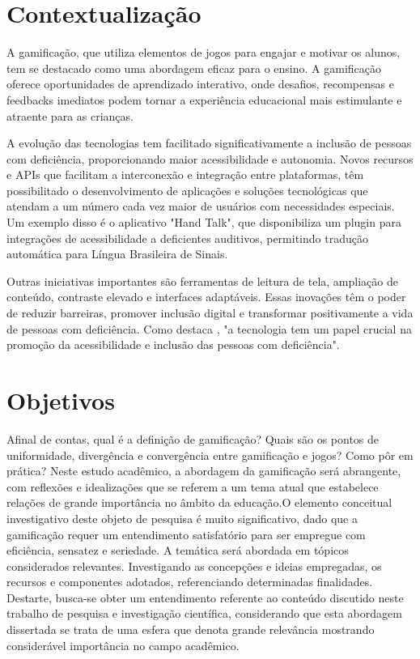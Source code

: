 \section{Contextualização}

A gamificação, que utiliza elementos de jogos para engajar e motivar os alunos, tem se destacado como uma abordagem eficaz para o ensino. A gamificação oferece oportunidades de aprendizado interativo, onde desafios, recompensas e feedbacks imediatos podem tornar a experiência educacional mais estimulante e atraente para as crianças.

A evolução das tecnologias tem facilitado significativamente a inclusão de pessoas com deficiência, proporcionando maior acessibilidade e autonomia. Novos recursos e APIs que facilitam a interconexão e integração entre plataformas, têm possibilitado o desenvolvimento de aplicações e soluções tecnológicas que atendam a um número cada vez maior de usuários com necessidades especiais. Um exemplo disso é o aplicativo "Hand Talk", que disponibiliza um plugin para integrações de acessibilidade a deficientes auditivos, permitindo tradução automática para Língua Brasileira de Sinais.

Outras iniciativas importantes são ferramentas de leitura de tela, ampliação de conteúdo, contraste elevado e interfaces adaptáveis. Essas inovações têm o poder de reduzir barreiras, promover inclusão digital e transformar positivamente a vida de pessoas com deficiência. Como destaca  \cite{furlan2016desenvolvimento}, "a tecnologia tem um papel crucial na promoção da acessibilidade e inclusão das pessoas com deficiência".


\section{Objetivos}

Afinal de contas, qual é a definição de gamificação? Quais são os pontos de uniformidade, divergência e convergência entre gamificação e jogos? Como pôr em prática? Neste estudo acadêmico, a abordagem da gamificação será abrangente, com reflexões e idealizações que se referem a um tema atual que estabelece relações de grande importância no âmbito da educação.O elemento conceitual investigativo deste objeto de pesquisa é muito significativo, dado que a gamificação requer um entendimento satisfatório para ser empregue com eficiência, sensatez e seriedade. A temática será abordada em tópicos considerados relevantes. Investigando as concepções e ideias empregadas, os recursos e componentes adotados, referenciando determinadas finalidades. Destarte, busca-se obter um entendimento referente ao conteúdo discutido neste trabalho de pesquisa e investigação científica, considerando que esta abordagem dissertada se trata de uma esfera que denota grande relevância mostrando considerável importância no campo acadêmico.


